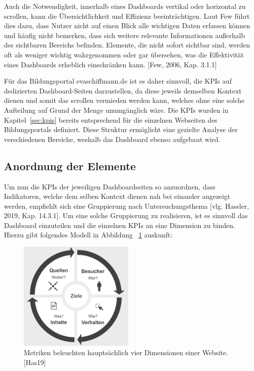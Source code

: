 Auch die Notwendigkeit, innerhalb eines Dashboards vertikal oder horizontal zu scrollen, kann die Übersichtlichkeit und Effizienz beeinträchtigen. Laut Few führt dies dazu, dass Nutzer nicht auf einen Blick alle wichtigen Daten erfassen können und häufig nicht bemerken, dass sich weitere relevante Informationen außerhalb des sichtbaren Bereichs befinden. Elemente, die nicht sofort sichtbar sind, werden oft als weniger wichtig wahrgenommen oder gar übersehen, was die Effektivität eines Dashboards erheblich einschränken kann. [Few, 2006, Kap. 3.1.1]

Für das Bildungsportal evaschiffmann.de ist es daher sinnvoll, die KPIs auf dedizierten Dashboard-Seiten darzustellen, da diese jeweils demselben Kontext dienen und somit das scrollen vermieden werden kann, welches ohne eine solche Aufteilung auf Grund der Menge unumgänglich wäre. Die KPIs wurden in Kapitel~\ref{sec:kpis} bereits entsprechend für die einzelnen Webseiten des Bildungsportals definiert. Diese Struktur ermöglicht eine gezielte Analyse der verschiedenen Bereiche, weshalb das Dashboard ebenso aufgebaut wird.

\subsection{Anordnung der Elemente}
Um nun die KPIs der jeweiligen Dashboardseiten so anzuordnen, dass Indikatoren, welche dem selben Kontext dienen nah bei einander angezeigt werden, empfiehlt sich eine Gruppierung nach Untersuchungsthema [vlg. Hassler, 2019, Kap. 14.3.1]. Um eine solche Gruppierung zu realisieren, ist es sinnvoll das Dashboard einzuteilen und die einzelnen KPIs an eine Dimension zu binden. Hierzu gibt folgendes Modell in Abbildung ~\ref{fig:dimensionen} auskunft: 

\begin{figure}[h]
    \centering
    \includegraphics[width=0.5\textwidth]{images/dimensionen.png}%
    \caption{Metriken beleuchten hauptsächlich vier Dimensionen einer Website. [Has19]}%
    \label{fig:dimensionen}%
\end{figure}

